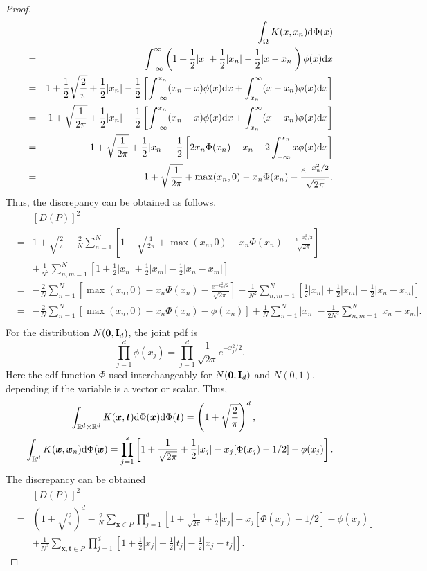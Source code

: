 \documentclass[graybox]{svmult}
\newcommand{\reals}{\mathbb{R}}
\newcommand{\vx}{\boldsymbol{x}}
\newcommand{\vt}{\boldsymbol{t}}
\newcommand{\dif}{{\rm d}}
\begin{document}
\begin{proof}
\begin{eqnarray*}
&&\int_{\Omega}K(x,x_n)\dif \Phi(x)\\
&=& \int_{-\infty}^{\infty} \left(1+\frac{1}{2}|x|+\frac{1}{2}|x_n|-\frac{1}{2}|x-x_n|\right)\phi(x)\dif x\\
&=& 1+\frac{1}{2}\sqrt{\frac{2}{\pi}}+\frac{1}{2}|x_n|-\frac{1}{2}\left[\int_{-\infty}^{x_n}(x_n-x)\phi(x)\dif x+\int_{x_n}^{\infty} (x-x_n)\phi(x)\dif x\right]\\
&=& 1+\sqrt{\frac{1}{2\pi}}+\frac{1}{2}|x_n|-\frac{1}{2}\left[\int_{-\infty}^{x_n}(x_n-x)\phi(x)\dif x+\int_{x_n}^{\infty} (x-x_n)\phi(x)\dif x\right]\\
&=& 1+\sqrt{\frac{1}{2\pi}}+\frac{1}{2}|x_n|-\frac{1}{2}\left[2x_n\Phi(x_n)-x_n-2\int_{-\infty}^{x_n}x\phi(x)\dif x\right]\\
&=& 1+\sqrt{\frac{1}{2\pi}}+\max(x_n,0)-x_n\Phi(x_n)-\frac{ e^{-x_n^2/2}}{\sqrt{2\pi}}. 
\end{eqnarray*}
Thus, the discrepancy can be obtained as follows. 
\begin{eqnarray*}
&& [D(P)]^2\\
&= &1+\sqrt{\frac{2}{\pi}}-\frac{2}{N}\sum_{n=1}^N \left[1+\sqrt{\frac{1}{2\pi}}+\max(x_n,0)-x_n\Phi(x_n)-\frac{ e^{-x_n^2/2}}{\sqrt{2\pi}}\right]\\
&&+\frac{1}{N^2}\sum_{n,m=1}^N \left[1+\frac{1}{2}|x_n|+\frac{1}{2}|x_m|-\frac{1}{2}|x_n-x_m|\right]\\
&= &-\frac{2}{N}\sum_{n=1}^N \left[\max(x_n,0)-x_n\Phi(x_n)-\frac{ e^{-x_n^2/2}}{\sqrt{2\pi}}\right]+\frac{1}{N^2}\sum_{n,m=1}^N \left[\frac{1}{2}|x_n|+\frac{1}{2}|x_m|-\frac{1}{2}|x_n-x_m|\right]\\
&=& -\frac{2}{N}\sum_{n=1}^N \left[\max(x_n,0)-x_n\Phi(x_n)-\phi(x_n)\right]+\frac{1}{N}\sum_{n=1}^N|x_n|-\frac{1}{2N^2}\sum_{n,m=1}^N|x_n-x_m|.\\
\end{eqnarray*}
For the distribution $N({\bf 0}, {\bf I}_d)$, the joint pdf is $$\prod\limits_{j=1}^d\phi(x_j) = \prod\limits_{j=1}^d \frac{1}{\sqrt{2\pi}}e^{-x_j^2/2}.$$
Here the cdf function $\Phi$ used interchangeably for $N({\bf 0}, {\bf I}_d)$ and $N(0, 1)$, depending if the variable is a vector or scalar. Thus, 
\begin{align*}
\int_{\reals^d\times \reals^d} K(\vx,\vt)&\dif\Phi(\vx)\dif\Phi(\vt) = \left(1+\sqrt{\frac{2}{\pi}}\right)^d, \\
\int_{\reals^d}K(\vx,\vx_n)\dif\Phi(\vx) = \prod\limits_{j=1}^s&\left[ 1+\frac{1}{\sqrt{2\pi}}+\frac{1}{2}|x_j|-x_j[\Phi(x_j)-1/2]-\phi(x_j)\right].
\end{align*}
The discrepancy can be obtained
\begin{eqnarray*}
&&[D(P)]^2\\
&=& \left(1+\sqrt{\frac{2}{\pi}}\right)^d - \frac{2}{N}\sum\limits_{\vx\in P} \prod\limits_{j=1}^d\left[ 1+\frac{1}{\sqrt{2\pi}}+\frac{1}{2}|x_j|-x_j[\Phi(x_j)-1/2]-\phi(x_j)\right]\\
&&+\frac{1}{N^2}\sum_{\vx,\vt\in P}\prod_{j=1}^d \left[1+\frac{1}{2}|x_j|+\frac{1}{2}|t_j|-\frac{1}{2}|x_j-t_j|\right]. 
\end{eqnarray*}       
\end{proof}


%

\end{document}
